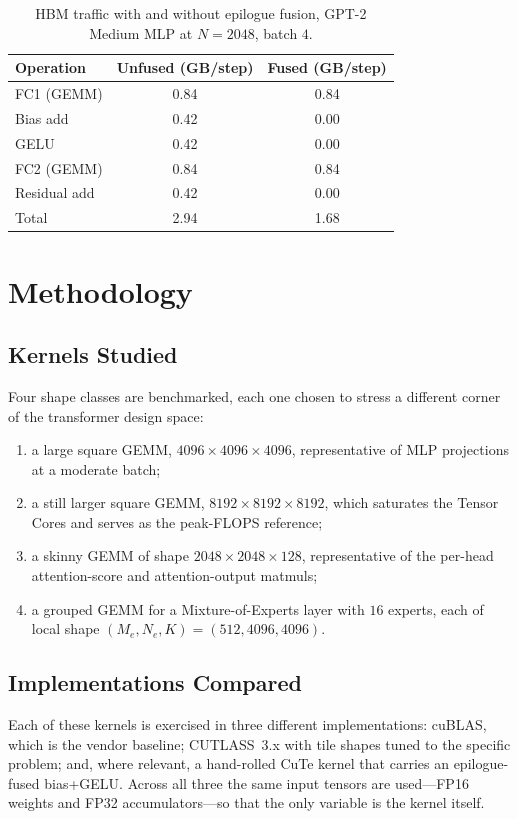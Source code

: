 \begin{table}[h]
\centering
\caption{HBM traffic with and without epilogue fusion,
         GPT-2 Medium MLP at $N{=}2048$, batch $4$.}
\label{tab:epilogue_bw}
\begin{tabular}{lcc}
\toprule
\textbf{Operation} & \textbf{Unfused (GB/step)} & \textbf{Fused (GB/step)} \\
\midrule
FC1 (GEMM)         & 0.84 & 0.84 \\
Bias add            & 0.42 & 0.00 \\
GELU                & 0.42 & 0.00 \\
FC2 (GEMM)         & 0.84 & 0.84 \\
Residual add        & 0.42 & 0.00 \\
\midrule
Total               & 2.94 & 1.68 \\
\bottomrule
\end{tabular}
\end{table}

\section{Methodology}\label{sec:cutlass_method}

\subsection{Kernels Studied}\label{sec:cutlass_method_kernels}
Four shape classes are benchmarked, each one chosen to stress a
different corner of the transformer design space:
\begin{enumerate}
    \item a large square GEMM, $4096 \times 4096 \times 4096$,
          representative of MLP projections at a moderate batch;
    \item a still larger square GEMM, $8192 \times 8192 \times
          8192$, which saturates the Tensor Cores and serves as
          the peak-FLOPS reference;
    \item a skinny GEMM of shape $2048 \times 2048 \times 128$,
          representative of the per-head attention-score and
          attention-output matmuls;
    \item a grouped GEMM for a Mixture-of-Experts layer with $16$
          experts, each of local shape
          $(M_e, N_e, K) = (512, 4096, 4096)$.
\end{enumerate}

\subsection{Implementations Compared}\label{sec:cutlass_method_impl}
Each of these kernels is exercised in three different
implementations: cuBLAS, which is the vendor baseline; CUTLASS~3.x
with tile shapes tuned to the specific problem; and, where
relevant, a hand-rolled CuTe kernel that carries an
epilogue-fused bias+GELU. Across all three the same input tensors
are used---FP16 weights and FP32 accumulators---so that the only
variable is the kernel itself.


